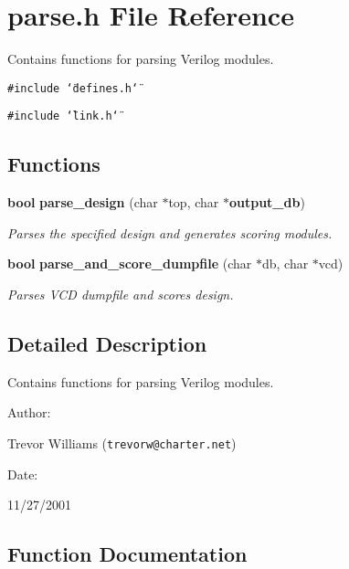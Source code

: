 \section{parse.h File Reference}
\label{parse_8h}
Contains functions for parsing Verilog modules. 


{\tt \#include \char`\"{}defines.h\char`\"{}}\par
{\tt \#include \char`\"{}link.h\char`\"{}}\par
\subsection*{Functions}
\begin{CompactItemize}
\item 
{\bf bool} {\bf parse\_\-design} (char $\ast$top, char $\ast${\bf output\_\-db})
\begin{CompactList}\small\item\em Parses the specified design and generates scoring modules.\item\end{CompactList}\item 
{\bf bool} {\bf parse\_\-and\_\-score\_\-dumpfile} (char $\ast$db, char $\ast$vcd)
\begin{CompactList}\small\item\em Parses VCD dumpfile and scores design.\item\end{CompactList}\end{CompactItemize}


\subsection{Detailed Description}
Contains functions for parsing Verilog modules.



\begin{Desc}
\item[Author: ]\par
Trevor Williams ({\tt trevorw@charter.net}) \end{Desc}
\begin{Desc}
\item[Date: ]\par
11/27/2001\end{Desc}


\subsection{Function Documentation}
